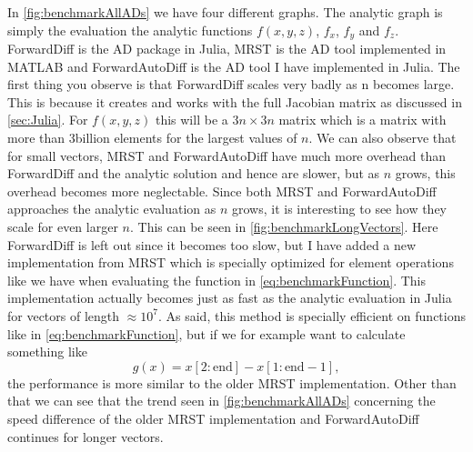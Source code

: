 In \autoref{fig:benchmarkAllADs} we have four different graphs. The analytic graph is simply the evaluation the analytic functions $f(x,y,z)$, $f_x$, $f_y$ and $f_z$. ForwardDiff is the AD package in Julia, MRST is the AD tool implemented in MATLAB and ForwardAutoDiff is the AD tool I have implemented in Julia. The first thing you observe is that ForwardDiff scales very badly as n becomes large. This is because it creates and works with the full Jacobian matrix as discussed in \autoref{sec:Julia}. For $f(x,y,z)$ this will be a $3n \times 3n$ matrix which is a matrix with more than 3billion elements for the largest values of $n$. We can also observe that for small vectors, MRST and ForwardAutoDiff have much more overhead than ForwardDiff and the analytic solution and hence are slower, but as $n$ grows, this overhead becomes more neglectable. Since both MRST and ForwardAutoDiff approaches the analytic evaluation as $n$ grows, it is interesting to see how they scale for even larger $n$. This can be seen in \autoref{fig:benchmarkLongVectors}. Here ForwardDiff is left out since it becomes too slow, but I have added a new implementation from MRST which is specially optimized for element operations like we have when evaluating the function in \eqref{eq:benchmarkFunction}. This implementation actually becomes just as fast as the analytic evaluation in Julia for vectors of length $\approx 10^7$. As said, this method is specially efficient on functions like in \eqref{eq:benchmarkFunction}, but if we for example want to calculate something like
\begin{equation}
g(x) = x\left[2:\text{end}\right] - x\left[1:\text{end}-1\right],
\label{eq:differenceFunction}
\end{equation}
the performance is more similar to the older MRST implementation. Other than that we can see that the trend seen in \autoref{fig:benchmarkAllADs} concerning the speed difference of the older MRST implementation and ForwardAutoDiff continues for longer vectors.

